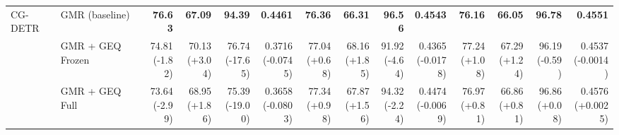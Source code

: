 \documentclass{article}
\begin{document}
{\begin{tabular}{llrrrrrrrrrrrr}
\midrule
CG-DETR & GMR (baseline) & \textbf{76.63} & \textbf{67.09} & \textbf{94.39} & \textbf{0.4461} & \textbf{76.36} & \textbf{66.31} & \textbf{96.56} & \textbf{0.4543} & \textbf{76.16} & \textbf{66.05} & \textbf{96.78} & \textbf{0.4551} \\
 & GMR + GEQ Frozen & \shortstack{74.81 \\ {\scriptsize\textcolor{Loss}{(-1.82)}}} & \shortstack{70.13 \\ {\scriptsize\textcolor{Gain}{(+3.04)}}} & \shortstack{76.74 \\ {\scriptsize\textcolor{Loss}{(-17.65)}}} & \shortstack{0.3716 \\ {\scriptsize\textcolor{Loss}{(-0.0745)}}} & \shortstack{77.04 \\ {\scriptsize\textcolor{Gain}{(+0.68)}}} & \shortstack{68.16 \\ {\scriptsize\textcolor{Gain}{(+1.85)}}} & \shortstack{91.92 \\ {\scriptsize\textcolor{Loss}{(-4.64)}}} & \shortstack{0.4365 \\ {\scriptsize\textcolor{Loss}{(-0.0178)}}} & \shortstack{77.24 \\ {\scriptsize\textcolor{Gain}{(+1.08)}}} & \shortstack{67.29 \\ {\scriptsize\textcolor{Gain}{(+1.24)}}} & \shortstack{96.19 \\ {\scriptsize\textcolor{Loss}{(-0.59)}}} & \shortstack{0.4537 \\ {\scriptsize\textcolor{Loss}{(-0.0014)}}} \\
 & GMR + GEQ Full & \shortstack{73.64 \\ {\scriptsize\textcolor{Loss}{(-2.99)}}} & \shortstack{68.95 \\ {\scriptsize\textcolor{Gain}{(+1.86)}}} & \shortstack{75.39 \\ {\scriptsize\textcolor{Loss}{(-19.00)}}} & \shortstack{0.3658 \\ {\scriptsize\textcolor{Loss}{(-0.0803)}}} & \shortstack{77.34 \\ {\scriptsize\textcolor{Gain}{(+0.98)}}} & \shortstack{67.87 \\ {\scriptsize\textcolor{Gain}{(+1.56)}}} & \shortstack{94.32 \\ {\scriptsize\textcolor{Loss}{(-2.24)}}} & \shortstack{0.4474 \\ {\scriptsize\textcolor{Loss}{(-0.0069)}}} & \shortstack{76.97 \\ {\scriptsize\textcolor{Gain}{(+0.81)}}} & \shortstack{66.86 \\ {\scriptsize\textcolor{Gain}{(+0.81)}}} & \shortstack{96.86 \\ {\scriptsize\textcolor{Gain}{(+0.08)}}} & \shortstack{0.4576 \\ {\scriptsize\textcolor{Gain}{(+0.0025)}}} \\

\end{tabular}}
\end{document}
